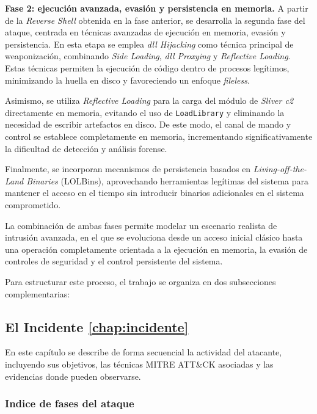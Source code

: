 \textbf{Fase 2: ejecución avanzada, evasión y persistencia en memoria.}  
A partir de la \textit{Reverse Shell} obtenida en la fase anterior, se desarrolla la segunda fase del ataque, centrada en técnicas avanzadas de ejecución en memoria, evasión y persistencia. En esta etapa se emplea \textit{\acrshort{dll} Hijacking} como técnica principal de weaponización, combinando \textit{Side Loading}, \textit{\acrshort{dll} Proxying} y \textit{Reflective Loading}. Estas técnicas permiten la ejecución de código dentro de procesos legítimos, minimizando la huella en disco y favoreciendo un enfoque \textit{fileless}.

Asimismo, se utiliza \textit{Reflective Loading} para la carga del módulo de \textit{Sliver \acrshort{c2}} directamente en memoria, evitando el uso de \texttt{LoadLibrary} y eliminando la necesidad de escribir artefactos en disco. De este modo, el canal de mando y control se establece completamente en memoria, incrementando significativamente la dificultad de detección y análisis forense.

Finalmente, se incorporan mecanismos de persistencia basados en \textit{Living-off-the-Land Binaries} (LOLBins), aprovechando herramientas legítimas del sistema para mantener el acceso en el tiempo sin introducir binarios adicionales en el sistema comprometido.

La combinación de ambas fases permite modelar un escenario realista de intrusión avanzada, en el que se evoluciona desde un acceso inicial clásico hasta una operación completamente orientada a la ejecución en memoria, la evasión de controles de seguridad y el control persistente del sistema.

Para estructurar este proceso, el trabajo se organiza en dos subsecciones complementarias:

\subsection{El Incidente \ref{chap:incidente}}
En este capítulo se describe de forma secuencial la actividad del atacante, incluyendo sus objetivos, las técnicas MITRE ATT\&CK asociadas y las evidencias donde pueden observarse.

\subsubsection{Indice de fases del ataque} \label{sec:indice-fases-ataque}

